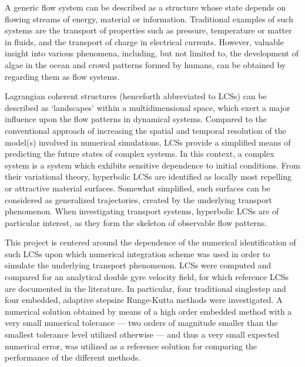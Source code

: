 A generic flow system can be described as a structure whose state depends on
flowing streams of energy, material or information. Traditional examples of
such systems are the transport of properties such as pressure, temperature or
matter in fluids, and the transport of charge in electrical currents. However,
valuable insight into various phenomena, including, but not limited to, the
development of algae in the ocean and crowd patterns formed by humans, can
be obtained by regarding them as flow systems.

Lagrangian coherent structures (henceforth abbreviated to LCSs) can be described
as `landscapes' within a multidimensional space, which exert a major influence
upon the flow patterns in dynamical systems.
Compared to the conventional approach of increasing the spatial and temporal
resolution of the model(s) involved in numerical simulations, LCSs provide a
simplified means of predicting the future states of complex systems. In this
context, a complex system is a system which exhibits sensitive dependence
to initial conditions.
From their variational theory, hyperbolic LCSs are identified as locally most
repelling or attractive material surfaces. Somewhat simplified, such surfaces
can be considered as generalized trajectories, created by the underlying
transport phenomenon. When investigating transport systems, hyperbolic LCSs are
of particular interest, as they form the skeleton of observable flow patterns.

This project is centered around the dependence of the numerical identification
of such LCSs upon which numerical integration scheme was used in order to
simulate the underlying transport phenomenon.
LCSs were computed and compared for an analytical double gyre velocity
field, for which reference LCSs are documented in the literature. In particular,
four traditional singlestep and four embedded, adaptive stepsize Runge-Kutta
methods were investigated. A numerical solution obtained by means of a high
order embedded method with a very small numerical tolerance --- two orders of
magnitude smaller than the smallest tolerance level utilized otherwise ---
and thus a very small expected numerical error, was utilized as a reference
solution for comparing the performance of the different methods.

